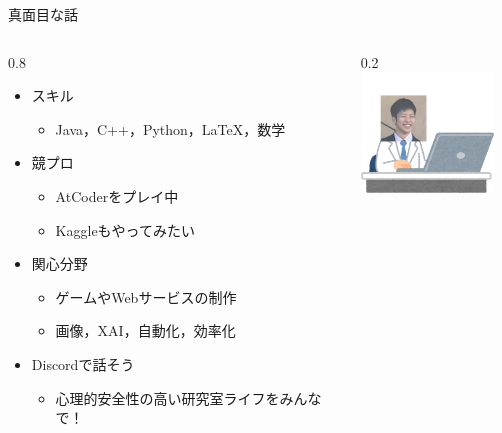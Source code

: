\documentclass[aspectratio=169, dvipdfmx, 14pt, xcolor={svgnames,dvipsnames}]{beamer}
\newlength{\mytotalwidth}
\newlength{\mycolumnwidth}
\begin{document}
\begin{frame}{\quad 真面目な話}
  \begin{columns}[totalwidth=\mytotalwidth]
    \begin{column}[t]{0.8\mycolumnwidth}
      \begin{itemize}
        \item スキル
              \begin{itemize}
                \item Java，C++，Python，LaTeX，数学
              \end{itemize}
        \item 競プロ
              \begin{itemize}
                \item AtCoderをプレイ中
                \item Kaggleもやってみたい
              \end{itemize}
        \item 関心分野
              \begin{itemize}
                \item ゲームやWebサービスの制作
                \item 画像，XAI，自動化，効率化
              \end{itemize}
        \item Discordで話そう
              \begin{itemize}
                \item 心理的安全性の高い研究室ライフをみんなで！
              \end{itemize}
      \end{itemize}
    \end{column}
    \begin{column}[T]{0.2\mycolumnwidth}
      \centering
      \includegraphics[width=100pt]{img/icon_pc.png}
    \end{column}
  \end{columns}
\end{frame}
\end{document}
